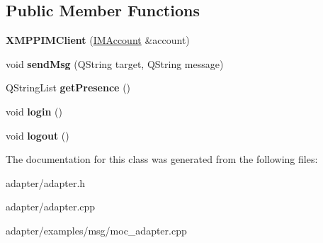 \subsection*{Public Member Functions}
\begin{DoxyCompactItemize}
\item 
\hypertarget{classXMPPIMClient_a8b42298615c65362800b338eaa01566d}{
{\bfseries XMPPIMClient} (\hyperlink{classIMAccount}{IMAccount} \&account)}
\label{classXMPPIMClient_a8b42298615c65362800b338eaa01566d}

\item 
\hypertarget{classXMPPIMClient_aa84fff629e311842be3461d3f9dcad18}{
void {\bfseries sendMsg} (QString target, QString message)}
\label{classXMPPIMClient_aa84fff629e311842be3461d3f9dcad18}

\item 
\hypertarget{classXMPPIMClient_a2dec1bfd485a5e1ee691ad4a11bf5b77}{
QStringList {\bfseries getPresence} ()}
\label{classXMPPIMClient_a2dec1bfd485a5e1ee691ad4a11bf5b77}

\item 
\hypertarget{classXMPPIMClient_a95bc16bff71222c54758c66c828db124}{
void {\bfseries login} ()}
\label{classXMPPIMClient_a95bc16bff71222c54758c66c828db124}

\item 
\hypertarget{classXMPPIMClient_af517015c407413a984bdec34a589ae23}{
void {\bfseries logout} ()}
\label{classXMPPIMClient_af517015c407413a984bdec34a589ae23}

\end{DoxyCompactItemize}


The documentation for this class was generated from the following files:\begin{DoxyCompactItemize}
\item 
adapter/adapter.h\item 
adapter/adapter.cpp\item 
adapter/examples/msg/moc\_\-adapter.cpp\end{DoxyCompactItemize}
